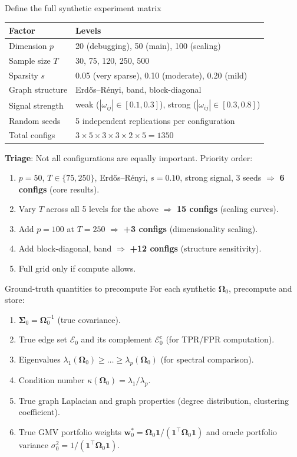 \documentclass[11pt,a4paper]{article}
\newcommand{\bOmega}{\bm{\Omega}}
\newcommand{\bSigma}{\bm{\Sigma}}
\begin{document}
\begin{action}{Define the full synthetic experiment matrix}
\begin{center}
\begin{tabular}{@{}ll@{}}
\toprule
\textbf{Factor} & \textbf{Levels} \\
\midrule
Dimension $p$ & 20 (debugging), 50 (main), 100 (scaling) \\
Sample size $T$ & 30, 75, 120, 250, 500 \\
Sparsity $s$ & 0.05 (very sparse), 0.10 (moderate), 0.20 (mild) \\
Graph structure & Erd\H{o}s--R\'enyi, band, block-diagonal \\
Signal strength & weak ($|\omega_{ij}| \in [0.1, 0.3]$), strong ($|\omega_{ij}| \in [0.3, 0.8]$) \\
Random seeds & 5 independent replications per configuration \\
\midrule
Total configs & $3 \times 5 \times 3 \times 3 \times 2 \times 5 = 1350$ \\
\bottomrule
\end{tabular}
\end{center}
\textbf{Triage}: Not all configurations are equally important. Priority order:
\begin{enumerate}[nosep]
  \item $p=50$, $T \in \{75, 250\}$, Erd\H{o}s--R\'enyi, $s=0.10$, strong signal, 3 seeds $\Rightarrow$ \textbf{6 configs} (core results).
  \item Vary $T$ across all 5 levels for the above $\Rightarrow$ \textbf{15 configs} (scaling curves).
  \item Add $p=100$ at $T=250$ $\Rightarrow$ \textbf{+3 configs} (dimensionality scaling).
  \item Add block-diagonal, band $\Rightarrow$ \textbf{+12 configs} (structure sensitivity).
  \item Full grid only if compute allows.
\end{enumerate}
\end{action}

\begin{mathbox}{Ground-truth quantities to precompute}
For each synthetic $\bOmega_0$, precompute and store:
\begin{enumerate}[nosep]
  \item $\bSigma_0 = \bOmega_0^{-1}$ (true covariance).
  \item True edge set $\mathcal{E}_0$ and its complement $\mathcal{E}_0^c$ (for TPR/FPR computation).
  \item Eigenvalues $\lambda_1(\bOmega_0) \geq \ldots \geq \lambda_p(\bOmega_0)$ (for spectral comparison).
  \item Condition number $\kappa(\bOmega_0) = \lambda_1/\lambda_p$.
  \item True graph Laplacian and graph properties (degree distribution, clustering coefficient).
  \item True GMV portfolio weights $\bm{w}_0^* = \bOmega_0\bm{1} / (\bm{1}^\top\bOmega_0\bm{1})$ and oracle portfolio variance $\sigma_0^2 = 1 / (\bm{1}^\top\bOmega_0\bm{1})$.
\end{enumerate}
\end{mathbox}
\end{document}
